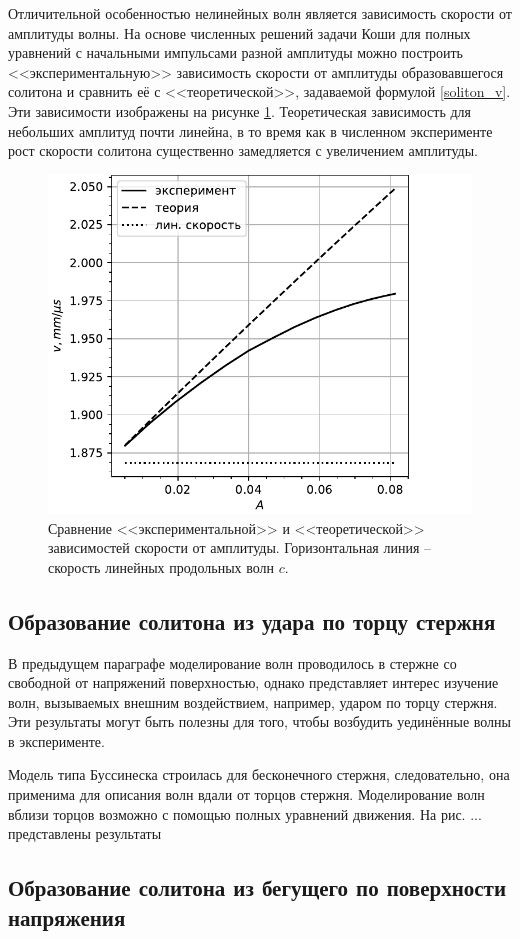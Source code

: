 \documentclass[12pt, a4paper]{report}
\begin{document}
Отличительной особенностью нелинейных волн является зависимость скорости от амплитуды волны. На основе численных решений задачи Коши для полных уравнений с начальными импульсами разной амплитуды можно построить <<экспериментальную>> зависимость скорости от амплитуды образовавшегося солитона и сравнить её с <<теоретической>>, задаваемой формулой \eqref{soliton_v}. Эти зависимости изображены на рисунке \ref{fig:vel_ampl}. Теоретическая зависимость для небольших амплитуд почти линейна, в то время как в численном эксперименте рост скорости солитона существенно замедляется с увеличением амплитуды.
\begin{figure}
	\centering
	\includegraphics[width=0.6\linewidth]{figures/vel_ampl}
	\caption{Сравнение <<экспериментальной>> и <<теоретической>> зависимостей скорости от амплитуды. Горизонтальная линия -- скорость линейных продольных волн $c$.}
	\label{fig:vel_ampl}
\end{figure}

\subsection{Образование солитона из удара по торцу стержня}
В предыдущем параграфе моделирование волн проводилось в стержне со свободной от напряжений поверхностью, однако представляет интерес изучение волн, вызываемых внешним воздействием, например, ударом по торцу стержня. Эти результаты могут быть полезны для того, чтобы возбудить уединённые волны в эксперименте. 

Модель типа Буссинеска строилась для бесконечного стержня, следовательно, она применима для описания волн вдали от торцов стержня. Моделирование волн вблизи торцов возможно с помощью полных уравнений движения. На рис. ... представлены результаты 

\subsection{Образование солитона из бегущего по поверхности напряжения}
\end{document}
